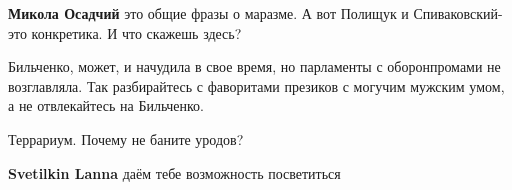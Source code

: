 \begin{itemize}
\begin{itemize} %
 
\textbf{Микола Осадчий} это общие фразы о маразме. А вот Полищук и Спиваковский-это конкретика. И что скажешь здесь?

 
Бильченко, может, и начудила в свое время, но парламенты с оборонпромами не возглавляла. Так разбирайтесь с фаворитами презиков с могучим мужским умом, а не отвлекайтесь на Бильченко.
\end{itemize} %

 
Террариум. Почему не баните уродов?

\begin{itemize} %
 
\textbf{Svetilkin Lanna} даём тебе возможность посветиться
\end{itemize} %

\end{itemize} %

